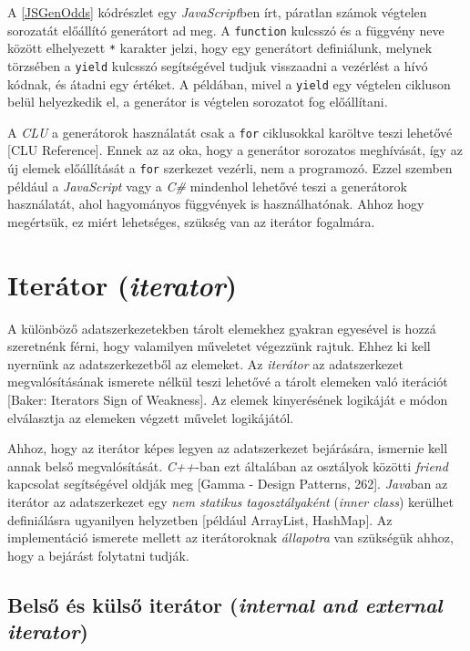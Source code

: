 A \ref{JSGenOdds} kódrészlet egy \textit{JavaScript}ben írt, páratlan számok végtelen sorozatát előállító generátort ad meg. A \texttt{function} kulcsszó és a függvény neve között elhelyezett \texttt{*} karakter jelzi, hogy egy generátort definiálunk, melynek törzsében a \texttt{yield} kulcsszó segítségével tudjuk visszaadni a vezérlést a hívó kódnak, és átadni egy értéket. A példában, mivel a \texttt{yield} egy végtelen cikluson belül helyezkedik el, a generátor is végtelen sorozatot fog előállítani.

A \textit{CLU} a generátorok használatát csak a \texttt{for} ciklusokkal karöltve teszi lehetővé [CLU Reference]. Ennek az az oka, hogy a generátor sorozatos meghívását, így az új elemek előállítását a \texttt{for} szerkezet vezérli, nem a programozó. Ezzel szemben például a \textit{JavaScript} vagy a \textit{C\#} mindenhol lehetővé teszi a generátorok használatát, ahol hagyományos függvények is használhatónak. Ahhoz hogy megértsük, ez miért lehetséges, szükség van az iterátor fogalmára.

\section{Iterátor (\textit{iterator})}

A különböző adatszerkezetekben tárolt elemekhez gyakran egyesével is hozzá szeretnénk férni, hogy valamilyen műveletet végezzünk rajtuk. Ehhez ki kell nyernünk az adatszerkezetből az elemeket. Az \textit{iterátor} az adatszerkezet megvalósításának ismerete nélkül teszi lehetővé a tárolt elemeken való iterációt [Baker: Iterators Sign of Weakness]. Az elemek kinyerésének logikáját e módon elválasztja az elemeken végzett művelet logikájától.

Ahhoz, hogy az iterátor képes legyen az adatszerkezet bejárására, ismernie kell annak belső megvalósítását. \textit{C++}-ban ezt általában az osztályok közötti \textit{friend} kapcsolat segítségével oldják meg [Gamma - Design Patterns, 262]. \textit{Java}ban az iterátor az adatszerkezet egy \textit{nem statikus tagosztályaként} (\textit{inner class}) kerülhet definiálásra ugyanilyen helyzetben [például ArrayList, HashMap]. Az implementáció ismerete mellett az iterátoroknak \textit{állapotra} van szükségük ahhoz, hogy a bejárást folytatni tudják. 

\subsection{Belső és külső iterátor (\textit{internal and external iterator})}

